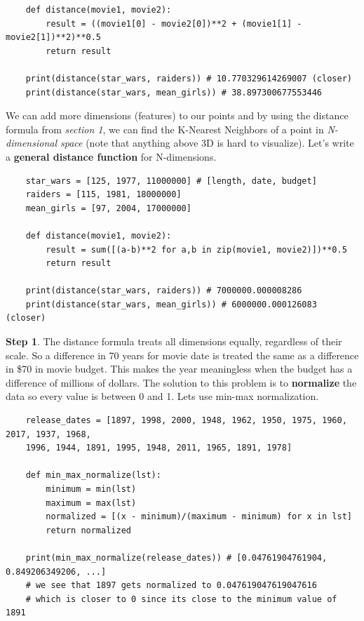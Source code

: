 \documentclass[11pt, a4paper]{article}
\begin{document}
\begin{spacing}{1.1}
\begin{lstlisting}
	def distance(movie1, movie2):
		result = ((movie1[0] - movie2[0])**2 + (movie1[1] - movie2[1])**2)**0.5
		return result
	
	print(distance(star_wars, raiders)) # 10.770329614269007 (closer)
	print(distance(star_wars, mean_girls)) # 38.897300677553446 \end{lstlisting}\vspace*{1mm}
	We can add more dimensions (features) to our points and by using the distance formula from \textit{section 1}, we can find the K-Nearest Neighbors of a point in \textit{N-dimensional space} (note that anything above 3D is hard to visualize). Let's write a \textbf{general distance function} for N-dimensions.
	\begin{lstlisting}
	star_wars = [125, 1977, 11000000] # [length, date, budget]
	raiders = [115, 1981, 18000000]
	mean_girls = [97, 2004, 17000000]
	
	def distance(movie1, movie2):
		result = sum([(a-b)**2 for a,b in zip(movie1, movie2)])**0.5
		return result
	
	print(distance(star_wars, raiders)) # 7000000.000008286
	print(distance(star_wars, mean_girls)) # 6000000.000126083 (closer) \end{lstlisting}\vspace*{1mm}
	\textbf{Step 1}. The distance formula treats all dimensions equally, regardless of their scale. So a difference in 70 years for movie date is treated the same as a difference in \$70 in movie budget. This makes the year meaningless when the budget has a difference of millions of dollars. The solution to this problem is to \textbf{normalize} the data so every value is between 0 and 1. Lets use min-max normalization.
	\begin{lstlisting}
	release_dates = [1897, 1998, 2000, 1948, 1962, 1950, 1975, 1960, 2017, 1937, 1968, 
	1996, 1944, 1891, 1995, 1948, 2011, 1965, 1891, 1978]
	
	def min_max_normalize(lst):
		minimum = min(lst)
		maximum = max(lst)
		normalized = [(x - minimum)/(maximum - minimum) for x in lst]
		return normalized
	
	print(min_max_normalize(release_dates)) # [0.04761904761904, 0.849206349206, ...]
	# we see that 1897 gets normalized to 0.047619047619047616
	# which is closer to 0 since its close to the minimum value of 1891 \end{lstlisting} \newpage
	

\end{spacing}
\end{document}
